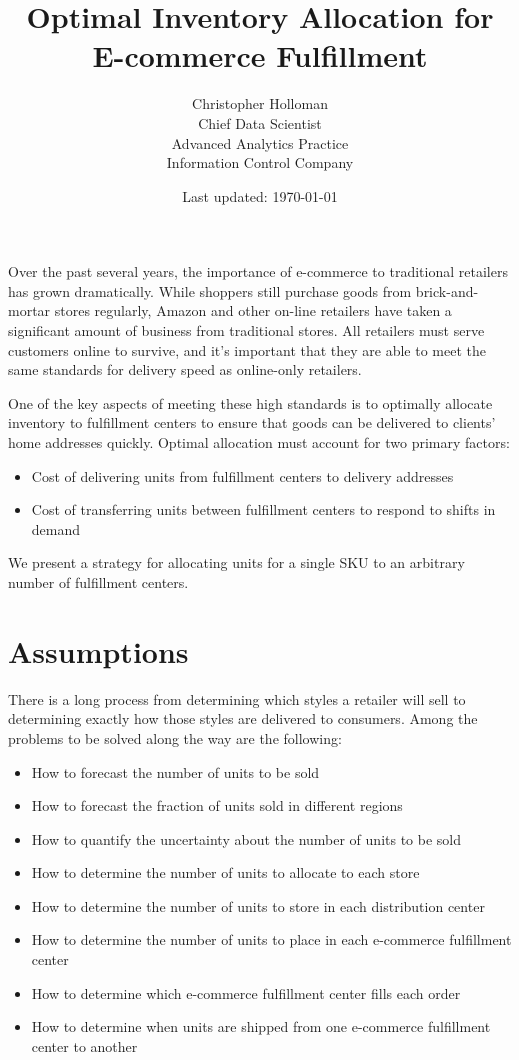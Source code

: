 \documentclass[11pt, oneside]{article}   	%
\title{Optimal Inventory Allocation for E-commerce Fulfillment}
\author{Christopher Holloman \\ Chief Data Scientist \\ Advanced Analytics Practice \\ Information Control Company}
\date{Last updated: \today}							%
\begin{document}
\maketitle

Over the past several years, the importance of e-commerce to traditional retailers has grown dramatically.  While shoppers still purchase goods from brick-and-mortar stores regularly, Amazon and other on-line retailers have taken a significant amount of business from traditional stores.  All retailers must serve customers online to survive, and it's important that they are able to meet the same standards for delivery speed as online-only retailers.

One of the key aspects of meeting these high standards is to optimally allocate inventory to fulfillment centers to ensure that goods can be delivered to clients' home addresses quickly.  Optimal allocation must account for two primary factors:

\begin{itemize}
\item Cost of delivering units from fulfillment centers to delivery addresses
\item Cost of transferring units between fulfillment centers to respond to shifts in demand
\end{itemize}

We present a strategy for allocating units for a single SKU to an arbitrary number of fulfillment centers.

\section{Assumptions}

There is a long process from determining which styles a retailer will sell to determining exactly how those styles are delivered to consumers.  Among the problems to be solved along the way are the following:

\begin{itemize}
\item How to forecast the number of units to be sold
\item How to forecast the fraction of units sold in different regions
\item How to quantify the uncertainty about the number of units to be sold
\item How to determine the number of units to allocate to each store
\item How to determine the number of units to store in each distribution center
\item How to determine the number of units to place in each e-commerce fulfillment center
\item How to determine which e-commerce fulfillment center fills each order
\item How to determine when units are shipped from one e-commerce fulfillment center to another
\end{itemize}
\end{document}
